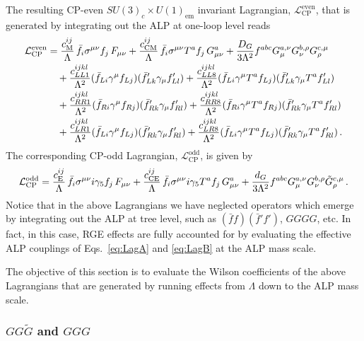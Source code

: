 The resulting CP-even $SU(3)_c \times U(1)_{\text{em}}$ invariant Lagrangian, $\mathcal{L}^{\text{even}}_{\text{CP}}$, that is generated by integrating out the ALP at one-loop level reads
\begin{align}
\label{eq:CPELag}
 \mathcal{L}^{\text{even}}_{\text{CP}} &= 
\frac{c_{\rm M}^{ij}}{\Lambda} \, \bar{f}_i \sigma^{\mu\nu} f_j \, F_{\mu\nu} +  \frac{c_{\rm CM}^{ij}}{\Lambda} \, \bar{f}_i \sigma^{\mu\nu} T^a f_j \, G^a_{\mu\nu} + \frac{D_G}{3\Lambda^2} f^{abc} G_\mu^{a, \nu} G_{\nu}^{b, \rho} G_{\rho}^{c, \mu} \nonumber \\
& \quad + 
\frac{c_{LL1}^{ijkl}}{\Lambda^2}(\bar f_{Li} \gamma^\mu f_{Lj})(\bar f'_{Lk}\gamma_\mu f'_{Ll}) + \frac{c_{LL8}^{ijkl}}{\Lambda^2}(\bar f_{Li} \gamma^\mu T^a f_{Lj})(\bar f'_{Lk}\gamma_\mu T^a f'_{Ll})\nonumber \\
& \quad +
\frac{c_{RR1}^{ijkl}}{\Lambda^2}(\bar f_{Ri} \gamma^\mu f_{Rj})(\bar f'_{Rk}\gamma_\mu f'_{Rl}) +
\frac{c_{RR8}^{ijkl}}{\Lambda^2}(\bar f_{Ri} \gamma^\mu T^a f_{Rj})(\bar f'_{Rk}\gamma_\mu T^a f'_{Rl})\nonumber \\
& \quad +
\frac{c_{LR1}^{ijkl}}{\Lambda^2}(\bar f_{Li} \gamma^\mu f_{Lj})(\bar f'_{Rk}\gamma_\mu f'_{Rl}) +
\frac{c_{LR8}^{ijkl}}{\Lambda^2}(\bar f_{Li} \gamma^\mu T^a f_{Lj})(\bar f'_{Rk}\gamma_\mu T^a f'_{Rl})
\,. 
\end{align}
The corresponding CP-odd Lagrangian, $\mathcal{L}^{\text{odd}}_{\text{CP}}$, is given by
\begin{align}
\label{eq:CPOLag}
 \mathcal{L}^{\text{odd}}_{\text{CP}} = 
 \frac{c_{\rm E}^{ij}}{\Lambda} \, \bar{f}_i \sigma^{\mu\nu} i\gamma_5 f_j \, F_{\mu\nu} +  \frac{c_{\rm CE}^{ij}}{\Lambda} \, \bar{f}_i \sigma^{\mu\nu} i\gamma_5 T^a f_j \, G^a_{\mu\nu} + \frac{d_G}{3\Lambda^2} f^{abc} G_\mu^{a, \nu} G_{\nu}^{b, \rho} \tilde G_{\rho}^{c, \mu}\,.
\end{align}
%
Notice that in the above Lagrangians we have neglected operators which emerge by integrating out the ALP at tree level, such as $(\bar{f} f)( \bar{f}' f')$, $GGGG$, etc.
In fact, in this case, RGE effects are fully accounted for by evaluating the effective ALP couplings of Eqs.~\eqref{eq:LagA} and \eqref{eq:LagB} at the ALP mass scale.

%
The objective of this section is to evaluate the Wilson coefficients of the above Lagrangians that are generated
by running effects from $\Lambda$ down to the ALP mass scale.

%
\subsubsection{$GG\tilde G$ and $GGG$}
\label{sec:GGG}
%

